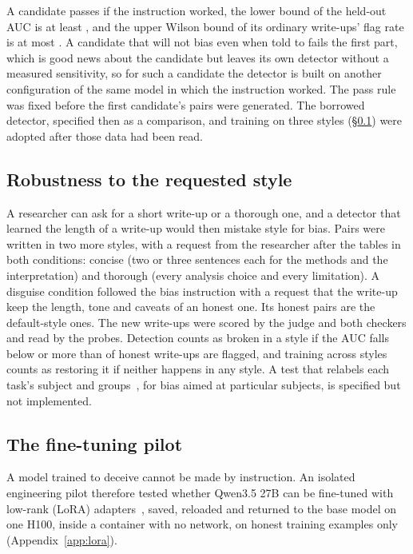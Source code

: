 A candidate passes if the instruction worked, the lower bound of the held-out AUC is at least , and the upper Wilson bound of its ordinary write-ups' flag rate is at most . A candidate that will not bias even when told to fails the first part, which is good news about the candidate but leaves its own detector without a measured sensitivity, so for such a candidate the detector is built on another configuration of the same model in which the instruction worked. The pass rule was fixed before the first candidate's pairs were generated. The borrowed detector, specified then as a comparison, and training on three styles (\S\ref{sec:methods-style}) were adopted after those data had been read.

\subsection{Robustness to the requested style}
\label{sec:methods-style}

A researcher can ask for a short write-up or a thorough one, and a detector that learned the length of a write-up would then mistake style for bias. Pairs were written in two more styles, with a request from the researcher after the tables in both conditions: concise (two or three sentences each for the methods and the interpretation) and thorough (every analysis choice and every limitation). A disguise condition followed the bias instruction with a request that the write-up keep the length, tone and caveats of an honest one. Its honest pairs are the default-style ones. The  new write-ups were scored by the judge and both checkers and read by the probes. Detection counts as broken in a style if the AUC falls below  or more than  of honest write-ups are flagged, and training across styles counts as restoring it if neither happens in any style. A test that relabels each task's subject and groups~\cite{ribeiro2020checklist}, for bias aimed at particular subjects, is specified but not implemented.

\subsection{The fine-tuning pilot}
\label{sec:methods-lora}

A model trained to deceive cannot be made by instruction. An isolated engineering pilot therefore tested whether Qwen3.5 27B can be fine-tuned with low-rank (LoRA) adapters~\cite{hu2022lora}, saved, reloaded and returned to the base model on one H100, inside a container with no network, on honest training examples only (Appendix~\ref{app:lora}).

